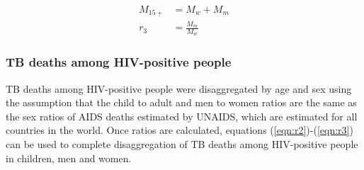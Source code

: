 \begin{align}
M_{15+} &= M_w + M_m \label{eqn:mm} \\
r_3 &= \frac{M_m}{M_w} \label{eqn:r3}
\end{align}



\subsubsection{TB deaths among HIV-positive people}

TB deaths among HIV-positive people were disaggregated by age and sex using the assumption that the child to adult and men to women ratios are the same as the sex ratios of AIDS deaths estimated by UNAIDS, which are estimated for all countries in the world. Once ratios are calculated, equations (\ref{eqn:r2})-(\ref{eqn:r3}) can be used to complete disaggregation of TB deaths among HIV-positive people in children, men and women.
